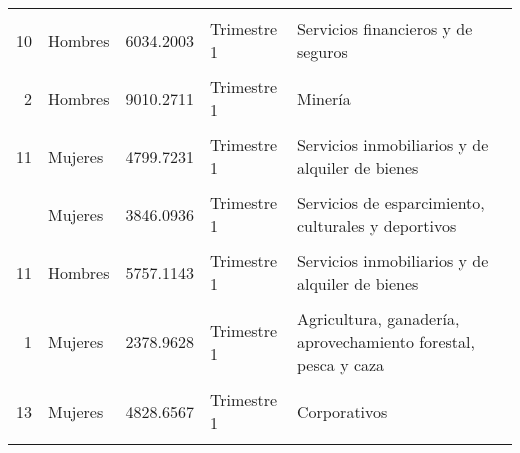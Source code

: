 \documentclass{article}
\begin{document}
\begin{table}[!h]
\begin{tabular}{rlrll}
\cellcolor{gray!10}{10} & \cellcolor{gray!10}{Mujeres} & \cellcolor{gray!10}{4746.0784} & \cellcolor{gray!10}{Trimestre 1} & \cellcolor{gray!10}{Servicios financieros y de seguros}\\
10 & Hombres & 6034.2003 & Trimestre 1 & Servicios financieros y de seguros\\
\addlinespace
\cellcolor{gray!10}{4} & \cellcolor{gray!10}{Mujeres} & \cellcolor{gray!10}{5327.7873} & \cellcolor{gray!10}{Trimestre 1} & \cellcolor{gray!10}{Construcción}\\
2 & Hombres & 9010.2711 & Trimestre 1 & Minería\\
\cellcolor{gray!10}{21} & \cellcolor{gray!10}{Hombres} & \cellcolor{gray!10}{1157.9407} & \cellcolor{gray!10}{Trimestre 1} & \cellcolor{gray!10}{No especificado}\\
11 & Mujeres & 4799.7231 & Trimestre 1 & Servicios inmobiliarios y de alquiler de bienes\\
\cellcolor{gray!10}{3} & \cellcolor{gray!10}{Mujeres} & \cellcolor{gray!10}{6347.9339} & \cellcolor{gray!10}{Trimestre 1} & \cellcolor{gray!10}{Generación y distribución de electricidad, suministro de agua y gas}\\
\addlinespace
17 & Mujeres & 3846.0936 & Trimestre 1 & Servicios de esparcimiento, culturales y deportivos\\
\cellcolor{gray!10}{8} & \cellcolor{gray!10}{Mujeres} & \cellcolor{gray!10}{5056.4211} & \cellcolor{gray!10}{Trimestre 1} & \cellcolor{gray!10}{Transportes, correos y almacenamiento}\\
11 & Hombres & 5757.1143 & Trimestre 1 & Servicios inmobiliarios y de alquiler de bienes\\
\cellcolor{gray!10}{13} & \cellcolor{gray!10}{Hombres} & \cellcolor{gray!10}{8912.0417} & \cellcolor{gray!10}{Trimestre 1} & \cellcolor{gray!10}{Corporativos}\\
1 & Mujeres & 2378.9628 & Trimestre 1 & Agricultura, ganadería, aprovechamiento forestal, pesca y caza\\
\addlinespace
\cellcolor{gray!10}{2} & \cellcolor{gray!10}{Mujeres} & \cellcolor{gray!10}{9968.0444} & \cellcolor{gray!10}{Trimestre 1} & \cellcolor{gray!10}{Minería}\\
13 & Mujeres & 4828.6567 & Trimestre 1 & Corporativos\\
\cellcolor{gray!10}{19} & \cellcolor{gray!10}{Hombres} & \cellcolor{gray!10}{4450.2401} & \cellcolor{gray!10}{Trimestre 2} & \cellcolor{gray!10}{Otros servicios, excepto actividades gubernamentales}\\

\end{tabular}
\end{table}
\end{document}
